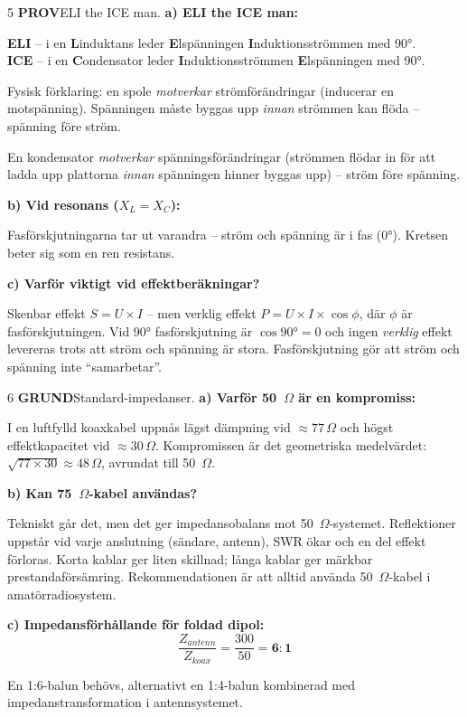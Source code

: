 \documentclass[a4paper,11pt,twoside]{book}
\newcommand{\qgrund}{\colorbox{greenpale}{\textcolor{greendark}{\headingfont\bfseries\tiny GRUND}}}
\newcommand{\qprov}{\colorbox{redpale}{\textcolor{reddark}{\headingfont\bfseries\tiny PROV}}}
\begin{document}
\begin{facitblock}{5}
\qprov\quad ELI the ICE man.
\tcblower
\textbf{a) ELI the ICE man:}

\textbf{ELI} -- i en \textbf{L}induktans leder 
\textbf{E}lspänningen \textbf{I}nduktionsströmmen med 90°.\\
\textbf{ICE} -- i en \textbf{C}ondensator leder 
\textbf{I}nduktionsströmmen \textbf{E}lspänningen med 90°.

Fysisk förklaring: en spole \emph{motverkar} 
strömförändringar (inducerar en motspänning). 
Spänningen måste byggas upp \emph{innan} strömmen 
kan flöda -- spänning före ström.

En kondensator \emph{motverkar} spänningsförändringar 
(strömmen flödar in för att ladda upp plattorna 
\emph{innan} spänningen hinner byggas upp) -- ström 
före spänning.

\textbf{b) Vid resonans ($X_L = X_C$):}

Fasförskjutningarna tar ut varandra -- ström och 
spänning är i fas (0°). Kretsen beter sig som en 
ren resistans.

\textbf{c) Varför viktigt vid effektberäkningar?}

Skenbar effekt $S = U \times I$ -- men verklig effekt 
$P = U \times I \times \cos\phi$, där $\phi$ är 
fasförskjutningen. Vid 90° fasförskjutning är $\cos 90° = 0$ 
och ingen \emph{verklig} effekt levereras trots att 
ström och spänning är stora. Fasförskjutning gör att 
ström och spänning inte ``samarbetar''.
\end{facitblock}


\begin{facitblock}{6}
\qgrund\quad Standard-impedanser.
\tcblower
\textbf{a) Varför 50~$\Omega$ är en kompromiss:}

I en luftfylld koaxkabel uppnås lägst dämpning vid 
$\approx 77\,\Omega$ och högst effektkapacitet vid 
$\approx 30\,\Omega$. Kompromissen är det geometriska 
medelvärdet: $\sqrt{77 \times 30} \approx 48\,\Omega$, 
avrundat till 50~$\Omega$.

\textbf{b) Kan 75~$\Omega$-kabel användas?}

Tekniskt går det, men det ger impedansobalans mot 
50~$\Omega$-systemet. Reflektioner uppstår vid varje 
anslutning (sändare, antenn), SWR ökar och en del 
effekt förloras. Korta kablar ger liten skillnad; 
långa kablar ger märkbar prestandaförsämring. 
Rekommendationen är att alltid använda 50~$\Omega$-kabel 
i amatörradiosystem.

\textbf{c) Impedansförhållande för foldad dipol:}
\[ \frac{Z_{antenn}}{Z_{koax}} = \frac{300}{50} = \mathbf{6:1} \]

En 1:6-balun behövs, alternativt en 1:4-balun 
kombinerad med impedanstransformation i antennsystemet.
\end{facitblock}
\end{document}
